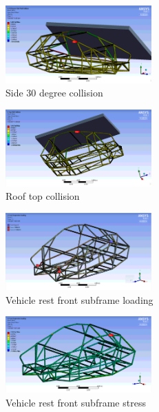 \documentclass[10pt]{article}
\begin{document}
\begin{figure}[H]
\centering
\includegraphics[width=0.5\textwidth]{figures/fea/chassis/chassis-collision-side-30deg}
\caption{Side 30 degree collision}
\label{fig:chassis-collision-side-30deg}
\end{figure}

\begin{figure}[H]
\centering
\includegraphics[width=0.5\textwidth]{figures/fea/chassis/chassis-collision-top}
\caption{Roof top collision}
\label{fig:chassis-collision-top}
\end{figure}

\begin{figure}[H]
\centering
\includegraphics[width=0.5\textwidth]{figures/fea/chassis/chassis-front-suspension-rest-loading}
\caption{Vehicle rest front subframe loading}
\label{fig:chassis-front-suspension-rest-loading}
\end{figure}

\begin{figure}[H]
\centering
\includegraphics[width=0.5\textwidth]{figures/fea/chassis/chassis-front-suspension-stress}
\caption{Vehicle rest front subframe stress}
\label{fig:chassis-front-suspension-stress}
\end{figure}
\end{document}
